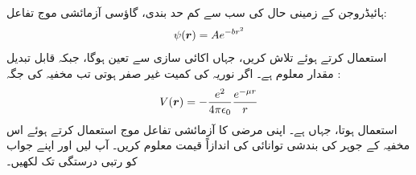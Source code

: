 ہائیڈروجن کے زمینی حال کی سب سے کم حد بندی، گاؤسی آزمائشی موج تفاعل:
\begin{align*}
\psi({{\boldsymbol{r}}})=Ae^{-br^{2}} 
\end{align*}
 استعمال کرتے ہوئے تلاش کریں، جہاں  اکائی سازی سے تعین ہوگا، جبکہ  قابل تبدیل مقدار معلوم ہے۔  
اگر نوریہ کی کمیت غیر صفر  ہوتی تب مخفیہ کی جگہ : 
\begin{align}
V({{\boldsymbol{r}}})=-\frac{e^{2}}{4\pi\epsilon_{0}}\frac{e^{-\mu r}}{r} 
\end{align}
 استعمال ہوتا، جہاں  ہے۔ اپنی مرضی کا آزمائشی تفاعل موج استعمال کرتے ہوئے اس مخفیہ کے  جوہر کی بندشی توانائی کی اندازاً قیمت معلوم کریں۔ آپ  لیں اور اپنے جواب کو  رتبی درستگی تک لکھیں۔
 
